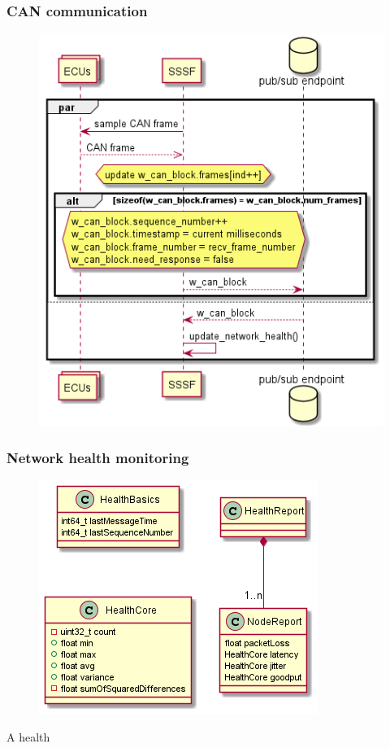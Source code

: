 \documentclass[letterpaper,twocolumn,12pt]{article}
\begin{document}
\subsubsection{CAN communication}
\begin{figure}[t!]
    \centering
    \includegraphics[width=\linewidth]{out/images/can_exchange/can_exchange.png}
    \caption{}
    \label{fig:}
\end{figure}
\subsubsection{Network health monitoring}
\begin{figure}[t!]
    \centering
    \includegraphics[width=\linewidth]{out/images/network_health/network_health.png}
    \caption{}
    \label{fig:}
\end{figure}
A health 
\end{document}
